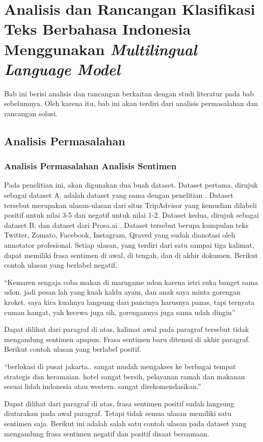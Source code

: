 \chapter{Analisis dan Rancangan Klasifikasi Teks Berbahasa Indonesia Menggunakan \textit{Multilingual Language Model}}

Bab ini berisi analisis dan rancangan berkaitan dengan studi literatur pada bab sebelumnya. Oleh karena itu, bab ini akan terdiri dari analisis permasalahan dan rancangan solusi.

\section{Analisis Permasalahan}
	\subsection{Analisis Permasalahan Analisis Sentimen}
	Pada penelitian ini, akan digunakan dua buah dataset. Dataset pertama, dirujuk sebagai dataset A, adalah dataset yang sama dengan penelitian \parencite{FarhanKhodra2017}. Dataset tersebut merupakan ulasan-ulasan dari situs TripAdvisor yang kemudian dilabeli positif untuk nilai 3-5 dan negatif untuk nilai 1-2. Dataset kedua, dirujuk sebagai dataset B,  dan dataset dari Prosa.ai \parencite{CrisdayantiPurwarianti2019}. Dataset tersebut berupa kumpulan teks Twitter, Zomato, Facebook, Instagram, Qraved yang sudah dianotasi oleh annotator profesional. Setiap ulasan, yang terdiri dari satu sampai tiga kalimat, dapat memiliki frasa sentimen di awal, di tengah, dan di akhir dokumen. Berikut contoh ulasan yang berlabel negatif.

	“Kemaren sengaja coba makan di marugame udon karena istri suka banget sama udon. jadi pesan lah yang kuah kaldu ayam, dan anak saya minta gorengan kroket. saya kira kuahnya langsung dari pancinya harusnya panas, tapi ternyata cuman hangat, yah kecewa juga sih, gorengannya juga sama udah dingin” 

	Dapat dilihat dari paragraf di atas, kalimat awal pada paragraf tersebut tidak mengandung sentimen apapun. Frasa sentimen baru ditemui di akhir paragraf. Berikut contoh ulasan yang berlabel positif.

	“berlokasi di pusat jakarta.. sangat mudah mengakses ke berbagai tempat strategis dan keramaian. hotel sangat bersih, pelayanan ramah dan makanan sesuai lidah indonesia atau western. sangat direkomendasikan.”

	Dapat dilihat dari paragraf di atas, frasa sentimen positif sudah langsung diutarakan pada awal paragraf. Tetapi tidak semua ulasan memiliki satu sentimen saja. Berikut ini adalah salah satu contoh ulasan pada dataset yang mengandung frasa sentimen negatif dan positif disaat bersamaan. 

